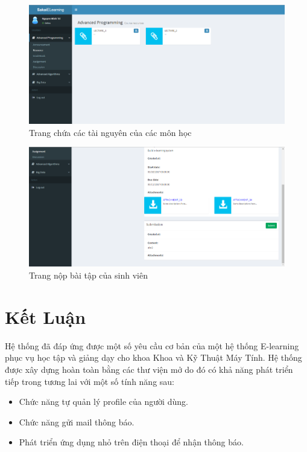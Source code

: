 \documentclass[12pt]{article}
\begin{document}
\begin{figure}[H]
\centering
\includegraphics[scale = 1]{sakai6.png}
\caption{Trang chứa các tài nguyên của các môn học}
\end{figure}

\begin{figure}[H]
\centering
\includegraphics[scale = 1]{sakai7.png}
\caption{Trang nộp bài tập của sinh viên}
\end{figure}

%
%
\section{Kết Luận}
Hệ thống đã đáp ứng được một số yêu cầu cơ bản của một hệ thống E-learning phục vụ học tập và giảng dạy cho khoa Khoa  và Kỹ Thuật Máy Tính. Hệ thống được xây dựng hoàn toàn bằng các thư viện mở do đó có khả năng phát triển tiếp trong tương lai với một số tính năng sau:
\begin{itemize}
\item Chức năng tự quản lý profile của người dùng.
\item Chức năng gửi mail thông báo.
\item Phát triển ứng dụng nhỏ trên điện thoại để nhận thông báo.
\end{itemize}
\end{document}
